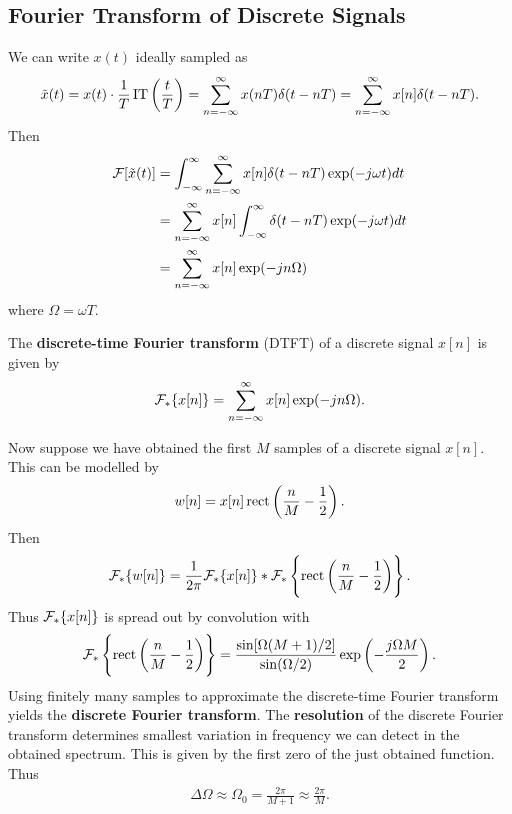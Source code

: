 \documentclass{memoir}
\begin{document}
\subsection{Fourier Transform of Discrete Signals}
We can write $x(t)$ ideally sampled as
\begin{align*}
    \tilde{x}(t) = x(t) \cdot \frac{1}{T}\operatorname{IT}\left(\frac{t}{T}\right) = \sum_{n=-\infty}^{\infty} x(nT) \delta(t - nT) = \sum_{n=-\infty}^{\infty} x[n] \delta(t - nT).
\end{align*}
Then
\begin{align*}
    \mathcal{F}[\tilde{x}(t)] &= \int_{-\infty}^{\infty} \sum_{n=-\infty}^{\infty} x[n] \delta(t - nT) \exp(-j \omega t) dt \\
    &= \sum_{n=-\infty}^{\infty} x[n] \int_{-\infty}^{\infty}  \delta(t - nT) \exp(-j \omega t) dt \\
    &= \sum_{n=-\infty}^{\infty} x[n] \exp(-j n \Omega)
\end{align*}
where $\Omega = \omega T$.
\begin{definition}
    The \textbf{discrete-time Fourier transform} (DTFT) of a discrete signal $x[n]$ is given by
    \begin{align*}
        \mathcal{F}_*\{x[n]\} = \sum_{n=-\infty}^{\infty} x[n] \exp(-j n \Omega).
    \end{align*}
\end{definition}
Now suppose we have obtained the first $M$ samples of a discrete signal $x[n]$. This can be modelled by
\begin{align*}
    w[n] = x[n]\operatorname{rect}\left(\frac{n}{M} - \frac{1}{2}\right).
\end{align*}
Then
\begin{align*}
    \mathcal{F}_*\{w[n]\} = \frac{1}{2 \pi} \mathcal{F}_*\{x[n]\} \ast \mathcal{F}_*\left\{\operatorname{rect}\left(\frac{n}{M} - \frac{1}{2}\right)\right\}.
\end{align*}
Thus $\mathcal{F}_*\{x[n]\}$ is spread out by convolution with
\begin{align*}
    \mathcal{F}_*\left\{\operatorname{rect}\left(\frac{n}{M} - \frac{1}{2}\right)\right\} = \frac{\sin[\Omega(M+1)/2]}{\sin(\Omega/2)}\exp\left(-\frac{j \Omega M}{2}\right).
\end{align*}
Using finitely many samples to approximate the discrete-time Fourier transform yields the \textbf{discrete Fourier transform}. The \textbf{resolution} of the discrete Fourier transform determines smallest variation in frequency we can detect in the obtained spectrum. This is given by the first zero of the just obtained function. Thus
\begin{align*}
    \Delta \Omega \approx \Omega_0 = \frac{2 \pi}{M+1} \approx \frac{2 \pi}{M}.
\end{align*}
\end{document}
